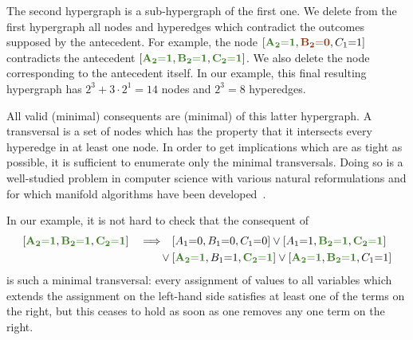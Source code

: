 \documentclass[aps,english,superscriptaddress,onecolumn,twoside,longbibliography,pra,floatfix,fleqn,nofootinbib]{revtex4-1}%
\newcommand*{\mred}[1]{{\color{RawSienna}{\mathbf{#1}}}}
\newcommand*{\mgreen}[1]{{\color{OliveGreen}{\mathbf{#1}}}}
\newcommand*{\tblue}[1]{{\color{MidnightBlue}{\textbf{#1}}}}
\theoremstyle{definition}
\newcommand{\cramp}[1]{\ensuremath{\mathord{#1}}}
\newcommand{\eql}{\cramp{=}}
\DeclarePairedDelimiter{\bracks}{\lbrack}{\rbrack}
\begin{document}
The second hypergraph is a sub-hypergraph of the first one. We delete from the first hypergraph all nodes and hyperedges which contradict the outcomes supposed by the antecedent. For example, the node $\bracks{\mgreen{A_2 \eql 1}, \mred{B_2 \eql 0}, C_1 \eql 1}$ contradicts the antecedent $\bracks{\mgreen{A_2 \eql 1}, \mgreen{B_2 \eql 1}, \mgreen{C_2 \eql 1}}$. We also delete the node corresponding to the antecedent itself. In our example, this final resulting hypergraph has $2^3 + 3\cdot 2^1 = 14$ nodes and $2^3 = 8$ hyperedges.

All valid (minimal) consequents are (minimal) \tblue{transversals} of this latter hypergraph. A transversal is a set of nodes which has the property that it intersects every hyperedge in at least one node. In order to get implications which are as tight as possible, it is sufficient to enumerate only the minimal transversals. Doing so is a well-studied problem in computer science with various natural reformulations and for which manifold algorithms have been developed~\cite{eiter_dualization_2008}.


In our example, it is not hard to check that the consequent of
\begin{align}\begin{split}\label{eq:F3implicationform}
	\bracks{\mgreen{A_2 \eql 1}, \mgreen{B_2 \eql 1}, \mgreen{C_2 \eql 1}} \quad\Longrightarrow\quad &\bracks{A_1 \eql 0, B_1 \eql 0, C_1 \eql 0} \lor \bracks{A_1 \eql 1, \mgreen{B_2 \eql 1}, \mgreen{C_2 \eql 1}} \\
	\lor\: & \bracks{\mgreen{A_2 \eql 1}, B_1 \eql 1, \mgreen{C_2 \eql 1}} \lor \bracks{\mgreen{A_2 \eql 1}, \mgreen{B_2 \eql 1}, C_1 \eql 1}
\end{split}\end{align}
is such a minimal transversal: every assignment of values to all variables which extends the assignment on the left-hand side satisfies at least one of the terms on the right, but this ceases to hold as soon as one removes any one term on the right. 
\end{document}
